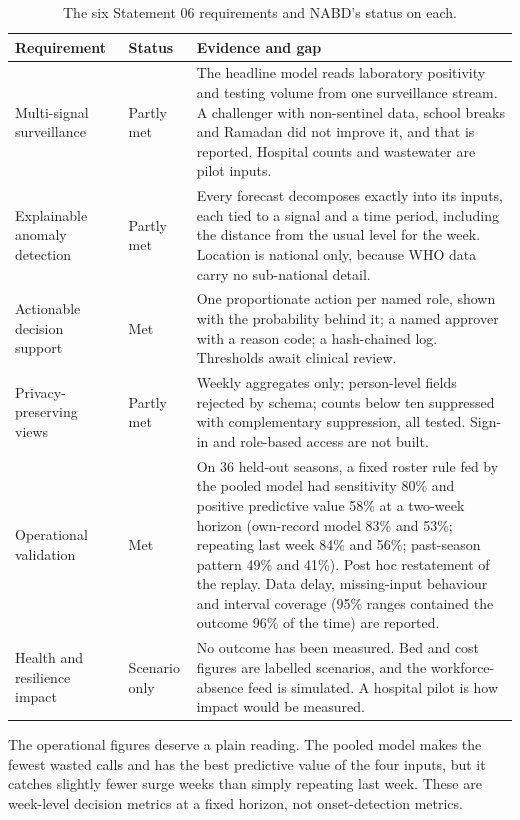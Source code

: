 \documentclass[11pt,a4paper]{article}
\begin{document}
\begin{table}[h]
\centering
\small
\begin{tabularx}{\textwidth}{@{}>{\raggedright\arraybackslash}p{3.2cm}>{\raggedright\arraybackslash}p{1.9cm}Y@{}}
\toprule
Requirement & Status & Evidence and gap \\
\midrule
Multi-signal surveillance & Partly met & The headline model reads laboratory positivity and testing volume from one surveillance stream. A challenger with non-sentinel data, school breaks and Ramadan did not improve it, and that is reported. Hospital counts and wastewater are pilot inputs. \\
Explainable anomaly detection & Partly met & Every forecast decomposes exactly into its inputs, each tied to a signal and a time period, including the distance from the usual level for the week. Location is national only, because WHO data carry no sub-national detail. \\
Actionable decision support & Met & One proportionate action per named role, shown with the probability behind it; a named approver with a reason code; a hash-chained log. Thresholds await clinical review. \\
Privacy-preserving views & Partly met & Weekly aggregates only; person-level fields rejected by schema; counts below ten suppressed with complementary suppression, all tested. Sign-in and role-based access are not built. \\
Operational validation & Met & On 36 held-out seasons, a fixed roster rule fed by the pooled model had sensitivity 80\% and positive predictive value 58\% at a two-week horizon (own-record model 83\% and 53\%; repeating last week 84\% and 56\%; past-season pattern 49\% and 41\%). Post hoc restatement of the replay. Data delay, missing-input behaviour and interval coverage (95\% ranges contained the outcome 96\% of the time) are reported. \\
Health and resilience impact & Scenario only & No outcome has been measured. Bed and cost figures are labelled scenarios, and the workforce-absence feed is simulated. A hospital pilot is how impact would be measured. \\
\bottomrule
\end{tabularx}
\caption{The six Statement 06 requirements and NABD's status on each.}
\label{tab:brief}
\end{table}

The operational figures deserve a plain reading. The pooled model makes the fewest wasted calls and has the best predictive value of the four inputs, but it catches slightly fewer surge weeks than simply repeating last week. These are week-level decision metrics at a fixed horizon, not onset-detection metrics.
\end{document}
